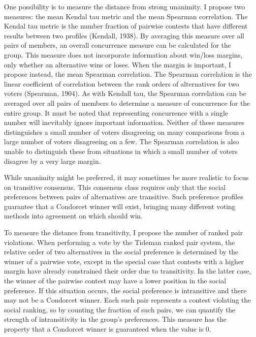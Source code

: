 One possibility is to measure the distance from strong unanimity. I propose two measures: the mean Kendal tau metric and the mean Spearman correlation. The Kendal tau metric is the number fraction of pairwise contests that have different results between two profiles (Kendall, 1938). By averaging this measure over all pairs of members, an overall concurrence measure can be calculated for the group. This measure does not incorporate information about win/loss margins, only whether an alternative wins or loses. When the margin is important, I propose instead, the mean Spearman correlation. The Spearman correlation is the linear coefficient of correlation between the rank orders of alternatives for two voters (Spearman, 1904). As with Kendall tau, the Spearman correlation can be averaged over all pairs of members to determine a measure of concurrence for the entire group. It must be noted that representing concurrence with a single number will inevitably ignore important information. Neither of these measures distinguishes a small number of voters disagreeing on many comparisons from a large number of voters disagreeing on a few. The Spearman correlation is also unable to distinguish these from situations in which a small number of voters disagree by a very large margin.

While unanimity might be preferred, it may sometimes be more realistic to focus on transitive consensus. This consensus class requires only that the social preferences between pairs of alternatives are transitive. Such preference profiles guarantee that a Condorcet winner will exist, bringing many different voting methods into agreement on which should win.

To measure the distance from transitivity, I propose the number of ranked pair violations. When performing a vote by the Tideman ranked pair system, the relative order of two alternatives in the social preference is determined by the winner of a pairwise vote, except in the special case that contests with a higher margin have already constrained their order due to transitivity. In the latter case, the winner of the pairwise contest may have a lower position in the social preference. If this situation occurs, the social preference is intransitive and there may not be a Condorcet winner. Each such pair represents a contest violating the social ranking, so by counting the fraction of such pairs, we can quantify the strength of intransitivity in the group’s preferences. This measure has the property that a Condorcet winner is guaranteed when the value is 0.

